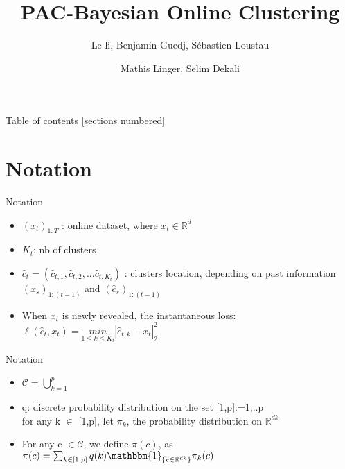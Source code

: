 \documentclass[10pt]{beamer}
\title{PAC-Bayesian Online Clustering}
\subtitle{Le li, Benjamin Guedj, Sébastien Loustau}
\date{}
\author{Mathis Linger, Selim Dekali}
\institute{ENSAE}
\begin{document}
\maketitle

\begin{frame}{Table of contents}
  [sections numbered]
  \tableofcontents[hideallsubsections]
\end{frame}

\section{Notation}

\begin{frame}[fragile]{Notation}
\begin{itemize}
\item $(x_{t})_{1:T}$ : online dataset, where $x_{t} \in \mathbb{R}^{d}$\\
\item $K_{t}$: nb of clusters\\
\item $\hat{c}_{t} = (\hat{c}_{t,1}, \hat{c}_{t,2},...\hat{c}_{t,K_{t}})$ : clusters location, depending on past information $(x_{s})_{1:(t-1)}$ and 
$(\hat{c}_{s})_{1:(t-1)} $\\

\smallbreak
\item When $x_{t}$ is newly revealed, the instantaneous loss:\\
\qquad $\ell(\hat{c}_{t}, x_{t}) = \underset{1 \leq k \leq K_{t}}{min} |\hat{c}_{t,k} - x_{t}|^{2}_{2}$\\
\end{itemize}
\end{frame}

\begin{frame}[fragile]{Notation}
\begin{itemize}
\item $\mathscr{C} = \bigcup^{p}_{k=1}$\\
\item q: discrete probability distribution on the set [1,p]:={1,..p}\\
for any k $\in$ [1,p], let $\pi_{k}$, the probability distribution on $\mathbb{R}^{dk}$\\
\smallbreak
\item For any c $\in \mathscr{C}$, we define $\pi(c)$, as\\
\qquad $\pi(c)= \sum_{k \in [1,p]} q(k) \mathbbm{1}_{\{ c\in\mathbb{R}^{dk}\}} \pi_{k}(c)$
\end{itemize}
\end{frame}
\end{document}
